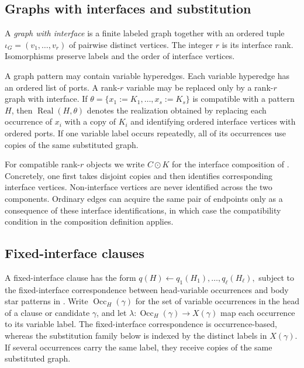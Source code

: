 \documentclass[11pt]{article}
\theoremstyle{definition}
\theoremstyle{remark}
\newcommand{\Real}{\operatorname{Real}}
\begin{document}
\subsection{Graphs with interfaces and substitution}

A \emph{graph with interface} is a finite labeled graph together with an
ordered tuple
\(\iota_G=(v_1,\ldots,v_r)\)
of pairwise distinct vertices. The integer \(r\) is its interface rank.
Isomorphisms preserve labels and the order of interface vertices.

A graph pattern may contain variable hyperedges. Each variable hyperedge has
an ordered list of ports. A rank-\(r\) variable may be replaced only by a
rank-\(r\) graph with interface. If
\(\theta=\{x_1:=K_1,\ldots,x_s:=K_s\}\)
is compatible with a pattern \(H\), then \(\Real(H,\theta)\) denotes the
realization obtained by replacing each occurrence of \(x_i\) with a copy of
\(K_i\) and identifying ordered interface vertices with ordered ports. If one
variable label occurs repeatedly, all of its occurrences use copies of the
same substituted graph.

For compatible rank-\(r\) objects we write
\(C\odot K\)
for the interface composition of \cite{ShoudaiEtAl2026}.  Concretely, one
first takes disjoint copies and then identifies corresponding interface
vertices.  Non-interface vertices are never identified across the two
components.  Ordinary edges can acquire the same pair of endpoints only as a
consequence of these interface identifications, in which case the
compatibility condition in the composition definition applies.

\subsection{Fixed-interface clauses}

A fixed-interface clause has the form
\(q(H)\leftarrow q_1(H_1),\ldots,q_\ell(H_\ell),\)
subject to the fixed-interface correspondence between head-variable
occurrences and body star patterns in \cite{ShoudaiEtAl2026}. Write
\(\operatorname{Occ}_H(\gamma)\) for the set of variable occurrences in the
head of a clause or candidate \(\gamma\), and let
\(\lambda:\operatorname{Occ}_H(\gamma)\to X(\gamma)\)
map each occurrence to its variable label. The fixed-interface correspondence
is occurrence-based, whereas the substitution family below is indexed by the
distinct labels in \(X(\gamma)\). If several occurrences carry the same label,
they receive copies of the same substituted graph.
\end{document}
